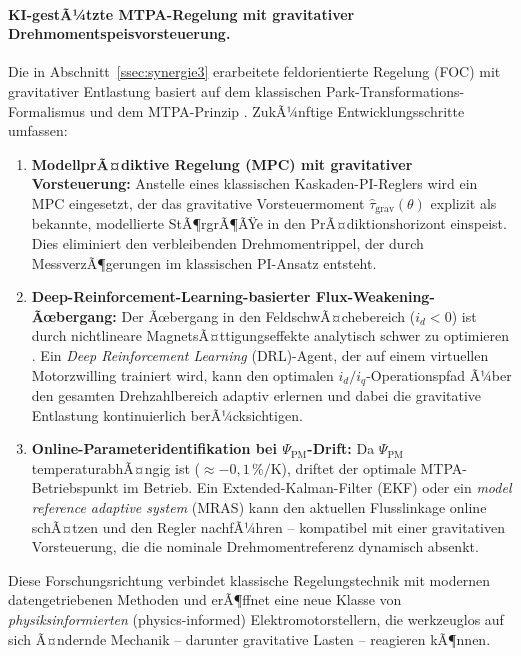 ﻿\documentclass[12pt, a4paper]{report}
\theoremstyle{definition}
\theoremstyle{remark}
\begin{document}
\paragraph{KI-gestÃ¼tzte MTPA-Regelung mit gravitativer
Drehmomentspeisvorsteuerung.}
Die in Abschnitt~\ref{ssec:synergie3} erarbeitete feldorientierte Regelung (FOC)
mit gravitativer Entlastung basiert auf dem klassischen Park-Transformations-Formalismus
\cite{park1929} und dem MTPA-Prinzip \cite{morimoto2006}. ZukÃ¼nftige
Entwicklungsschritte umfassen:
\begin{enumerate}[label=\arabic*.]
  \item \textbf{ModellprÃ¤diktive Regelung (MPC) mit gravitativer Vorsteuerung:}
        Anstelle eines klassischen Kaskaden-PI-Reglers \cite{vas1990} wird ein MPC
        eingesetzt, der das gravitative Vorsteuermoment $\hat\tau_{\text{grav}}(\theta)$
        explizit als bekannte, modellierte StÃ¶rgrÃ¶ÃŸe in den PrÃ¤diktionshorizont
        einspeist. Dies eliminiert den verbleibenden Drehmomentrippel, der durch
        MessverzÃ¶gerungen im klassischen PI-Ansatz entsteht.
  \item \textbf{Deep-Reinforcement-Learning-basierter Flux-Weakening-Ãœbergang:}
        Der Ãœbergang in den FeldschwÃ¤chebereich ($i_d < 0$) ist durch nichtlineare
        MagnetsÃ¤ttigungseffekte analytisch schwer zu optimieren \cite{bose2002}.
        Ein \emph{Deep Reinforcement Learning} (DRL)-Agent, der auf einem virtuellen
        Motorzwilling trainiert wird, kann den optimalen $i_d/i_q$-Operationspfad
        Ã¼ber den gesamten Drehzahlbereich adaptiv erlernen und dabei die gravitative
        Entlastung kontinuierlich berÃ¼cksichtigen.
  \item \textbf{Online-Parameteridentifikation bei $\Psi_{\text{PM}}$-Drift:}
        Da $\Psi_{\text{PM}}$ temperaturabhÃ¤ngig ist ($\approx -0{,}1\,\%/\text{K}$),
        driftet der optimale MTPA-Betriebspunkt im Betrieb. Ein Extended-Kalman-Filter
        (EKF) oder ein \emph{model reference adaptive system} (MRAS) kann den
        aktuellen Flusslinkage online schÃ¤tzen und den Regler nachfÃ¼hren --
        kompatibel mit einer gravitativen Vorsteuerung, die die nominale
        Drehmomentreferenz dynamisch absenkt.
\end{enumerate}
Diese Forschungsrichtung verbindet klassische Regelungstechnik \cite{park1929,
vas1990} mit modernen datengetriebenen Methoden und erÃ¶ffnet eine neue Klasse
von \emph{physiksinformierten} (physics-informed) Elektromotorstellern, die
werkzeuglos auf sich Ã¤ndernde Mechanik -- darunter gravitative Lasten -- reagieren
kÃ¶nnen.
\end{document}
